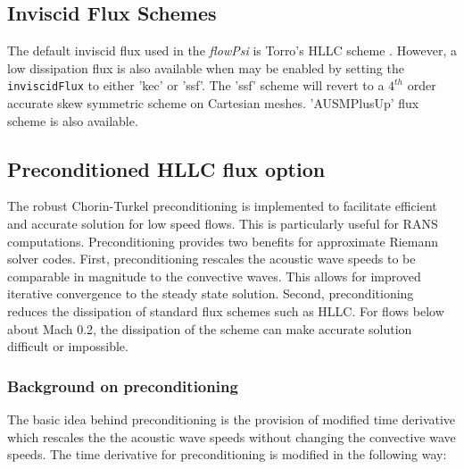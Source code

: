 \subsection{Inviscid Flux Schemes}

The default inviscid flux used in the {\it flowPsi} is Torro's HLLC
scheme \cite{Torro.1994}.  However, a low dissipation flux is also
available when may be enabled by setting the {\tt inviscidFlux} to
either 'kec' or 'ssf'.  The 'ssf' scheme will revert to a $4^{th}$
order accurate skew symmetric scheme on Cartesian meshes. 'AUSMPlusUp'
flux scheme is also available.

\subsection{Preconditioned HLLC flux option}

The robust Chorin-Turkel preconditioning is implemented to facilitate
efficient and accurate solution for low speed flows.  This is
particularly useful for RANS computations.  Preconditioning provides
two benefits for approximate Riemann solver codes.  First,
preconditioning rescales the acoustic wave speeds to be comparable in
magnitude to the convective waves.  This allows for improved iterative
convergence to the steady state solution.  Second, preconditioning
reduces the dissipation of standard flux schemes such as HLLC.  For
flows below about Mach 0.2, the dissipation of the scheme can make
accurate solution difficult or impossible.

\subsubsection{Background on preconditioning}

The basic idea behind preconditioning is the provision of modified
time derivative which rescales the the acoustic wave speeds without
changing the convective wave speeds.  The time derivative for preconditioning is modified in the following way:

